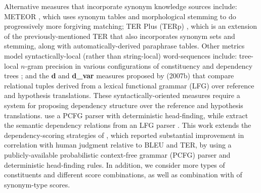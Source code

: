 \documentclass{kluwer}    %
\begin{document}
\begin{article}
Alternative measures that 
incorporate synonym knowledge sources include: METEOR
\cite{banerjee05meteor}, which uses synonym tables and
morphological stemming to do progressively more forgiving matching;
TER Plus (TERp) \cite{snover09terp}, which is an extension of the
previously-mentioned TER that also incorporates synonym sets and stemming, along
with automatically-derived paraphrase tables.  
%
Other metrics model syntactically-local (rather than string-local)
word-sequences include: tree-local
$n$-gram precision in various configurations of constituency and
dependency trees \cite{liu05syntaxformteval};
and the \textbf{d} and
\textbf{d\_var} measures proposed by 
(2007b) 
that compare relational tuples derived from a
lexical functional grammar (LFG)
over reference and hypothesis translations.
%
These syntactically-oriented measures require a system for proposing
dependency structure over the reference and hypothesis
translations.  use a
PCFG parser with deterministic head-finding, while 
\cite{owczarzak07evaluatingmt} extract the semantic dependency
relations from an LFG parser \cite{cahill04lfg}.
%
This work extends the dependency-scoring strategies of
, which reported substantial
improvement in correlation with human judgment relative to BLEU and
TER, by using a 
publicly-available probabilistic context-free grammar (PCFG) parser and deterministic head-finding rules. In addition, we consider more types of constituents and different score combinations, as well as combination with of synonym-type scores.
 

\end{article}
\end{document}
